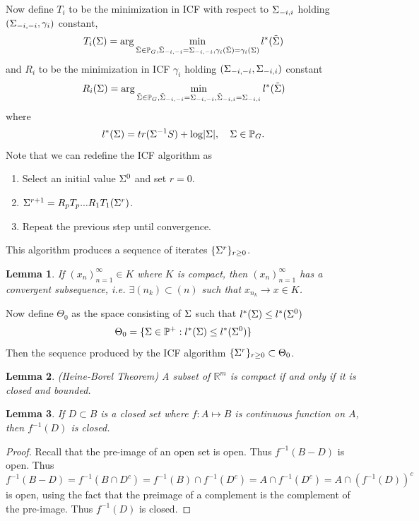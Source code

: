 \documentclass[12pt, leqno]{article}
\providecommand{\abs}[1]{\lvert#1\rvert}
\def\s{\ensuremath\Sigma}
\def\pd{\ensuremath\mathbb{P}^+}
\def\pg{\ensuremath\mathbb{P}_{{G}}}
\newtheorem{lemma}{Lemma}[]
\begin{document}
Now define $T_i$ to be the minimization in ICF with respect to
$\s_{-i,i}$ holding
  $(\s_{-i,-i},\gamma_i)$ constant,
\begin{align*}
T_i(\s) = \arg\min_{\tilde{\s} \in \pg,\tilde{\s}_{-i,-i} =
    {\s}_{-i,-i}, \gamma_i(\tilde{\s})=\gamma_i({\s})} l^*(\tilde{\s})
\end{align*}
and $R_i$ to be the minimization in ICF $\gamma_i$ holding
  $(\s_{-i,-i},\s_{-i,i})$ constant
\begin{align*}
R_i(\s) = \arg\min_{\tilde{\s} \in \pg,\tilde{\s}_{-i,-i} =
    {\s}_{-i,-i}, \tilde{\s}_{-i,i} =
    {\s}_{-i,i}} l^*(\tilde{\s})
\end{align*}
where 
\[
l^*(\s) = tr(\s^{-1} S) + \log \abs{\s}, \quad \s \in \pg.
\]  
Note that we can redefine the ICF algorithm as 
\begin{enumerate}
\item Select an initial value $\s^0$ and set $r = 0$.
\item $\s^{r+1} = R_pT_p...R_1T_1(\s^r)$.
\item Repeat the previous step until convergence.
\end{enumerate}
This algorithm produces a sequence of iterates $\{ \s^r\}_{r \geq 0}$.
\begin{lemma} \label{lemma:compactsetconvergentsubseq}
If $(x_n)_{n=1}^{\infty} \in K$ where $K$ is compact, then
$(x_n)_{n=1}^{\infty}$ has a convergent subsequence, i.e. $\exists
(n_k) \subset (n)$ such that $x_{n_k} \to x \in K$.
\end{lemma}
Now define $\Theta_0$ as the space consisting of $\s$ such that $l^*(\s) \leq l^*(\s^0)$ 
\[ \Theta_0 = \{\s \in \pd: l^*(\s) \leq l^*(\s^0)\}
\]
Then the sequence produced by the ICF algorithm $\{\s^r\}_{r \geq 0}
\subset \Theta_0$. 
\begin{lemma}
(Heine-Borel Theorem) A subset of $\mathbb{R}^m$ is compact if and
only if it is closed and bounded.
\end{lemma}
\begin{lemma}
If $D \subset B$ is a closed set where $f:A \mapsto B$ is continuous
function on $A$, then $f^{-1}(D)$ is closed.
\end{lemma}
\begin{proof}
Recall
that the pre-image of an open set is open. Thus $f^{-1}(B-D)$ is open. Thus
$f^{-1}(B-D) = f^{-1}(B \cap D^c) = f^{-1}(B) \cap f^{-1}(D^c) =
A \cap f^{-1}(D^c) = A \cap (f^{-1}(D))^c $ is open, using the fact
that the preimage of a complement is the complement of the pre-image. Thus $f^{-1}(D)$
is closed. 
\end{proof}
\end{document}
